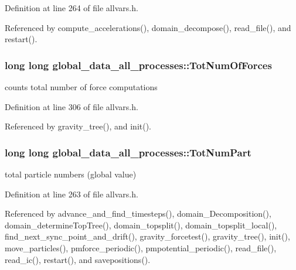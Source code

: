 Definition at line 264 of file allvars.h.



Referenced by compute\_\-accelerations(), domain\_\-decompose(), read\_\-file(), and restart().

\hypertarget{structglobal__data__all__processes_a44181b6f6375de86c7dda1059d2fc3f4}{
\subsubsection[{TotNumOfForces}]{\setlength{\rightskip}{0pt plus 5cm}long long {\bf global\_\-data\_\-all\_\-processes::TotNumOfForces}}}
\label{structglobal__data__all__processes_a44181b6f6375de86c7dda1059d2fc3f4}
counts total number of force computations 

Definition at line 306 of file allvars.h.



Referenced by gravity\_\-tree(), and init().

\hypertarget{structglobal__data__all__processes_a853bbd3ea833c0a6a57af1434b611868}{
\subsubsection[{TotNumPart}]{\setlength{\rightskip}{0pt plus 5cm}long long {\bf global\_\-data\_\-all\_\-processes::TotNumPart}}}
\label{structglobal__data__all__processes_a853bbd3ea833c0a6a57af1434b611868}
total particle numbers (global value) 

Definition at line 263 of file allvars.h.



Referenced by advance\_\-and\_\-find\_\-timesteps(), domain\_\-Decomposition(), domain\_\-determineTopTree(), domain\_\-topsplit(), domain\_\-topsplit\_\-local(), find\_\-next\_\-sync\_\-point\_\-and\_\-drift(), gravity\_\-forcetest(), gravity\_\-tree(), init(), move\_\-particles(), pmforce\_\-periodic(), pmpotential\_\-periodic(), read\_\-file(), read\_\-ic(), restart(), and savepositions().

